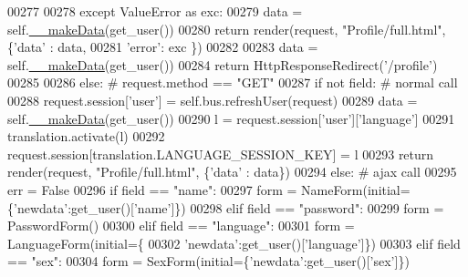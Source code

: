 \begin{DoxyCode}
00277 
00278             \textcolor{keywordflow}{except} ValueError \textcolor{keyword}{as} exc:
00279                 data = self.\hyperlink{classProfile_1_1ProfileUnit_1_1UiFullProfile_a84f94d7278f7f4a452ac4701dc19b6a7}{\_\_makeData}(get\_user())
00280                 \textcolor{keywordflow}{return} render(request, \textcolor{stringliteral}{"Profile/full.html"}, \{\textcolor{stringliteral}{'data'} : data,
00281                                                              \textcolor{stringliteral}{'error'}: exc \})
00282 
00283             data = self.\hyperlink{classProfile_1_1ProfileUnit_1_1UiFullProfile_a84f94d7278f7f4a452ac4701dc19b6a7}{\_\_makeData}(get\_user())
00284             \textcolor{keywordflow}{return} HttpResponseRedirect(\textcolor{stringliteral}{'/profile'})
00285 
00286         \textcolor{keywordflow}{else}: \textcolor{comment}{# request.method == "GET"}
00287             \textcolor{keywordflow}{if} \textcolor{keywordflow}{not} field: \textcolor{comment}{# normal call}
00288                 request.session[\textcolor{stringliteral}{'user'}] = self.bus.refreshUser(request)
00289                 data = self.\hyperlink{classProfile_1_1ProfileUnit_1_1UiFullProfile_a84f94d7278f7f4a452ac4701dc19b6a7}{\_\_makeData}(get\_user())
00290                 l = request.session[\textcolor{stringliteral}{'user'}][\textcolor{stringliteral}{'language'}]
00291                 translation.activate(l)
00292                 request.session[translation.LANGUAGE\_SESSION\_KEY] = l
00293                 \textcolor{keywordflow}{return} render(request, \textcolor{stringliteral}{"Profile/full.html"}, \{\textcolor{stringliteral}{'data'} : data\})
00294             \textcolor{keywordflow}{else}: \textcolor{comment}{# ajax call}
00295                 err = \textcolor{keyword}{False}
00296                 \textcolor{keywordflow}{if}   field == \textcolor{stringliteral}{"name"}:
00297                     form = NameForm(initial=\{\textcolor{stringliteral}{'newdata'}:get\_user()[\textcolor{stringliteral}{'name'}]\})
00298                 \textcolor{keywordflow}{elif} field == \textcolor{stringliteral}{"password"}:
00299                     form = PasswordForm()
00300                 \textcolor{keywordflow}{elif} field == \textcolor{stringliteral}{"language"}:
00301                     form = LanguageForm(initial=\{
00302                             \textcolor{stringliteral}{'newdata'}:get\_user()[\textcolor{stringliteral}{'language'}]\})
00303                 \textcolor{keywordflow}{elif} field == \textcolor{stringliteral}{"sex"}:
00304                     form = SexForm(initial=\{\textcolor{stringliteral}{'newdata'}:get\_user()[\textcolor{stringliteral}{'sex'}]\})

\end{DoxyCode}
